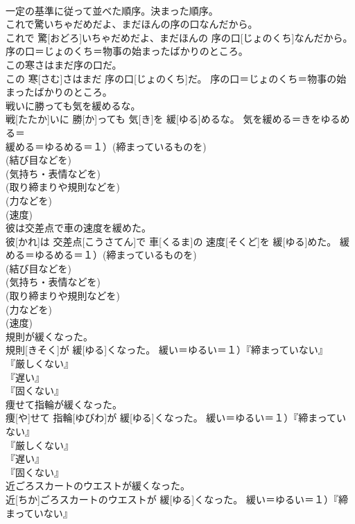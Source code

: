 \documentclass[8pt]{extreport}
\begin{document}
\begin{CJK}{UTF8}{min}
{\\	一定の基準に従って並べた順序。決まった順序。
\\	これで驚いちゃだめだよ、まだほんの序の口なんだから。	
\\	これで 驚[おどろ]いちゃだめだよ、まだほんの 序の口[じょのくち]なんだから。	序の口＝じょのくち＝物事の始まったばかりのところ。
\\	この寒さはまだ序の口だ。	
\\	この 寒[さむ]さはまだ 序の口[じょのくち]だ。	序の口＝じょのくち＝物事の始まったばかりのところ。
\\	戦いに勝っても気を緩めるな。	
\\	戦[たたか]いに 勝[か]っても 気[き]を 緩[ゆる]めるな。	気を緩める＝きをゆるめる＝ 
\\	緩める＝ゆるめる＝１）(締まっているものを) 
\\	(結び目などを) 
\\	(気持ち・表情などを) 
\\	(取り締まりや規則などを) 
\\	(力などを) 
\\	(速度) 
\\	彼は交差点で車の速度を緩めた。	
\\	彼[かれ]は 交差点[こうさてん]で 車[くるま]の 速度[そくど]を 緩[ゆる]めた。	緩める＝ゆるめる＝１）(締まっているものを) 
\\	(結び目などを) 
\\	(気持ち・表情などを) 
\\	(取り締まりや規則などを) 
\\	(力などを) 
\\	(速度) 
\\	規則が緩くなった。	
\\	規則[きそく]が 緩[ゆる]くなった。	緩い＝ゆるい＝１）『締まっていない』
\\	『厳しくない』
\\	『遅い』
\\	『固くない』
\\	痩せて指輪が緩くなった。	
\\	痩[や]せて 指輪[ゆびわ]が 緩[ゆる]くなった。	緩い＝ゆるい＝１）『締まっていない』
\\	『厳しくない』
\\	『遅い』
\\	『固くない』
\\	近ごろスカートのウエストが緩くなった。	
\\	近[ちか]ごろスカートのウエストが 緩[ゆる]くなった。	緩い＝ゆるい＝１）『締まっていない』
}
\end{CJK}
\end{document}
